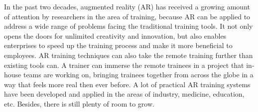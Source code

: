 %

In the past two decades, augmented reality (AR) has received a growing amount of attention by researchers in the area of training, because AR can be applied to address a wide range of problems facing the traditional training tools.
It not only opens the doors for unlimited creativity and innovation, but also enables enterprises to speed up the training process and make it more beneficial to employees.
AR training techniques can also take the remote training further than existing tools can. A trainer can immerse the remote trainees in a project that in-house teams are working on, bringing trainees together from across the globe in a way that feels more real then ever before.
A lot of practical AR training systems have been developed and applied in the areas of industry, medicine, education, etc.
Besides, there is still plenty of room to grow.

